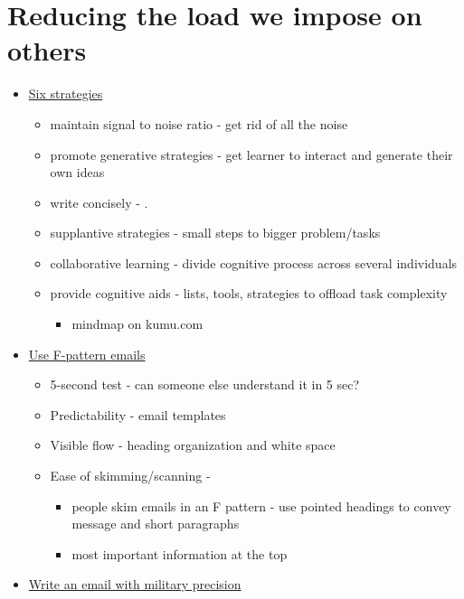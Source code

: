 \documentclass[
  letterpaper,
  DIV=11,
  numbers=noendperiod]{scrreprt}
\providecommand{\tightlist}{%
  \setlength{\itemsep}{0pt}\setlength{\parskip}{0pt}}\usepackage{longtable,booktabs,array}
\begin{document}
\hypertarget{reducing-the-load-we-impose-on-others}{%
\section*{\texorpdfstring{\textbf{Reducing the load we impose on
others}}{Reducing the load we impose on others}}\label{reducing-the-load-we-impose-on-others}}


\begin{itemize}
\item
  \href{http://theelearningcoach.com/learning/reduce-cognitive-load/}{Six
  strategies}

  \begin{itemize}
  \item
    maintain signal to noise ratio - get rid of all the noise
  \item
    promote generative strategies - get learner to interact and generate
    their own ideas
  \item
    write concisely - .
  \item
    supplantive strategies - small steps to bigger problem/tasks
  \item
    collaborative learning - divide cognitive process across several
    individuals
  \item
    provide cognitive aids - lists, tools, strategies to offload task
    complexity

    \begin{itemize}
    \tightlist
    \item
      mindmap on kumu.com
    \end{itemize}
  \end{itemize}
\item
  \href{https://blog.bananatag.com/internal-comms/cognitive-load-impact-on-internal-emails}{Use
  F-pattern emails}

  \begin{itemize}
  \item
    5-second test - can someone else understand it in 5 sec?
  \item
    Predictability - email templates
  \item
    Visible flow - heading organization and white space
  \item
    Ease of skimming/scanning -

    \begin{itemize}
    \item
      people skim emails in an F pattern - use pointed headings to
      convey message and short paragraphs
    \item
      most important information at the top
    \end{itemize}
  \end{itemize}
\item
  \href{https://hbr.org/2016/11/how-to-write-email-with-military-precision}{Write
  an email with military precision}


\end{itemize}
\end{document}
